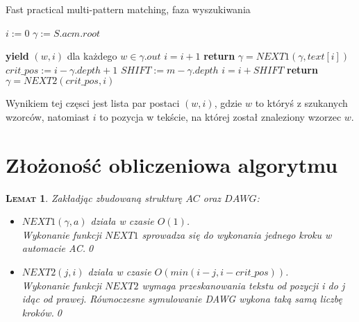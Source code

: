 \documentclass[a4paper,11pt]{article}
\newtheorem{LEM}[DEF]{\textsc{Lemat}}
\begin{document}
\begin{algorithm}
\caption{Fast practical multi-pattern matching, faza wyszukiwania}
\begin{algorithmic}[1]
 
\State $i := 0$ 
\State $\gamma := S.acm.root$ 

 
     
            \State \textbf{yield} $(w, i)$ dla każdego $w \in \gamma{.out}$
        \EndIf
        \State $i = i + 1$
            \State \textbf{return}
        \EndIf
        \State $\gamma = NEXT1(\gamma, text[i])$  
    \EndWhile
    \State $crit\_pos := i - \gamma{.depth} + 1$ 
    \State $SHIFT := m - \gamma{.depth}$ 
    \State $i = i + SHIFT$ 
        \State \textbf{return}
    \EndIf
    \State $\gamma = NEXT2(crit\_pos, i)$ 
\EndWhile
\EndProcedure
\end{algorithmic}
\end{algorithm}

Wynikiem tej częsci jest lista par postaci $(w, i)$, gdzie $w$ to któryś z szukanych wzorców, natomiast $i$ to pozycja w tekście, na której został znaleziony wzorzec $w$.

\section{Złożoność obliczeniowa algorytmu}

\begin{LEM}
Zakładjąc zbudowaną strukturę $AC$ oraz $DAWG$:
\begin{itemize}
    \item $NEXT1(\gamma, a)$ działa w czasie $O(1)$. \\
        Wykonanie funkcji $NEXT1$ sprowadza się do wykonania jednego kroku w automacie AC.\qed
    \item $NEXT2(j, i)$ działa w czasie $O(min(i-j, i - crit\_pos))$. \\
        Wykonanie funkcji $NEXT2$ wymaga przeskanowania tekstu od pozycji i do j idąc od prawej. Równoczesne symulowanie DAWG wykona taką samą liczbę kroków.\qed
\end{itemize}
\end{LEM}
\end{document}
